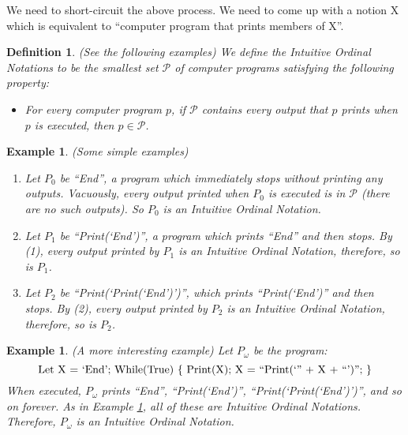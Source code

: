 \documentclass[runningheads]{llncs}
\newtheorem{myexample}[mytheorem]{Example}
\newtheorem{mydefinition}[mytheorem]{Definition}
\begin{document}
We need to short-circuit the above process. We need to come up with a notion
X which is equivalent to ``computer program that prints members of X''.

\begin{mydefinition}
\label{literalnotationdef}
    (See the following examples)
    We define the Intuitive Ordinal Notations to be the smallest set $\mathcal P$
    of computer programs satisfying the following property:
    \begin{itemize}
        \item
            For every computer program $p$,
            if $\mathcal P$ contains every output that $p$ prints when $p$ is executed,
            then $p\in\mathcal P$.
    \end{itemize}
\end{mydefinition}

\begin{myexample}
\label{simpleexamples}
(Some simple examples)
    \begin{enumerate}
    \item
    Let $P_0$ be ``End'', a program which immediately stops without printing any outputs.
    Vacuously, every output printed when $P_0$ is executed is in $\mathcal P$
    (there are no such outputs). So $P_0$ is an Intuitive Ordinal Notation.
    \item
    Let $P_1$ be ``Print(`End')'', a program which prints ``End'' and then
    stops. By (1), every output printed by $P_1$ is an Intuitive Ordinal Notation,
    therefore, so is $P_1$.
    \item
    Let $P_2$ be ``Print(`Print(`End')')'', which prints ``Print(`End')'' and then
    stops. By (2), every output printed by $P_2$ is an Intuitive Ordinal Notation,
    therefore, so is $P_2$.
    \end{enumerate}
\end{myexample}

\begin{myexample}
\label{omegaexample}
(A more interesting example)
    Let $P_\omega$ be the program:
    \[
        \mbox{\normalfont Let X = `End';
        While(True) \{ Print(X); X = ``Print(`'' + X + ``')''; \}}
    \]
    When executed, $P_\omega$ prints ``End'', ``Print(`End')'',
    ``Print(`Print(`End')')'', and so on forever. As
    in Example \ref{simpleexamples}, all of these are Intuitive Ordinal Notations.
    Therefore, $P_\omega$ is an Intuitive Ordinal Notation.
\end{myexample}
\end{document}
